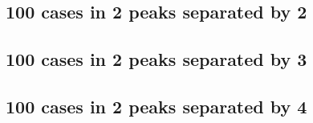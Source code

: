\subsection{100 cases in 2 peaks separated by 2}


\subsection{100 cases in 2 peaks separated by 3}


\subsection{100 cases in 2 peaks separated by 4}



